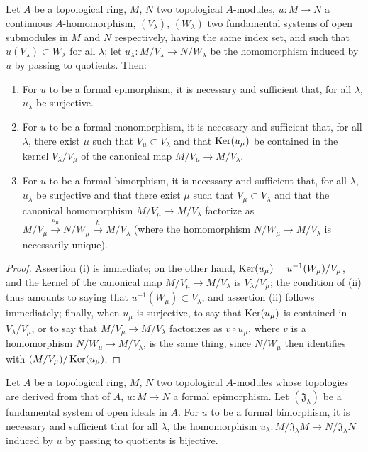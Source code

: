 \begin{proposition}[19.1.3]
\label{0.19.1.3}
Let $A$ be a topological ring, $M$, $N$ two topological $A$-modules, $u:M\to N$ a continuous $A$-homomorphism, $(V_\lambda)$, $(W_\lambda)$ two fundamental systems of open submodules in $M$ and $N$ respectively, having the same index set, and such that $u(V_\lambda)\subset W_\lambda$ for all $\lambda$;
let $u_\lambda:M/V_\lambda\to N/W_\lambda$ be the homomorphism induced by $u$ by passing to quotients.
Then:
\begin{enumerate}
  \item[\textup{(i)}] For $u$ to be a formal epimorphism, it is necessary and sufficient that, for all $\lambda$, $u_\lambda$ be surjective.
  \item[\textup{(ii)}] For $u$ to be a formal monomorphism, it is necessary and sufficient that, for all $\lambda$, there exist $\mu$ such that $V_\mu\subset V_\lambda$ and that $\operatorname{Ker}(u_\mu)$ be contained in the kernel $V_\lambda/V_\mu$ of the canonical map $M/V_\mu\to M/V_\lambda$.
  \item[\textup{(iii)}] For $u$ to be a formal bimorphism, it is necessary and sufficient that, for all $\lambda$, $u_\lambda$ be surjective and that there exist $\mu$ such that $V_\mu\subset V_\lambda$ and that the canonical homomorphism $M/V_\mu\to M/V_\lambda$
  factorize as $M/V_\mu\xrightarrow{u_\mu}N/W_\mu\xrightarrow{h}M/V_\lambda$ (where the homomorphism $N/W_\mu\to M/V_\lambda$ is necessarily unique).
\end{enumerate}
\end{proposition}

\begin{proof}
Assertion (i) is immediate;
on the other hand, $\operatorname{Ker}(u_\mu)=u^{-1}(W_\mu)/V_\mu$, and the kernel of the canonical map $M/V_\mu\to M/V_\lambda$ is $V_\lambda/V_\mu$;
the condition of (ii) thus amounts to saying that $u^{-1}(W_\mu)\subset V_\lambda$, and assertion (ii) follows immediately;
finally, when $u_\mu$ is surjective, to say that $\operatorname{Ker}(u_\mu)$ is contained in $V_\lambda/V_\mu$, or to say that $M/V_\mu\to M/V_\lambda$ factorizes as $v\circ u_\mu$, where $v$ is a homomorphism $N/W_\mu\to M/V_\lambda$, is the same thing, since $N/W_\mu$ then identifies with $(M/V_\mu)/\operatorname{Ker}(u_\mu)$.
\end{proof}

\begin{corollary}[19.1.4]
\label{0.19.1.4}
Let $A$ be a topological ring, $M$, $N$ two topological $A$-modules whose topologies are derived from that of $A$, $u:M\to N$ a formal epimorphism.
Let $(\mathfrak{J}_\lambda)$ be a fundamental system of open ideals in $A$.
For $u$ to be a formal bimorphism, it is necessary and sufficient that for all $\lambda$, the homomorphism $u_\lambda:M/\mathfrak{J}_\lambda M\to N/\mathfrak{J}_\lambda N$ induced by $u$ by passing to quotients is bijective.
\end{corollary}

